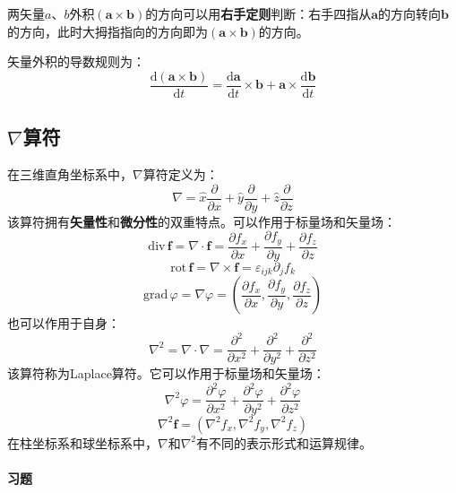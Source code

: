\documentclass[fontset=none,openany,a4paper]{ctexbook}
\begin{document}
两矢量$a$、$b$外积$(\bm{a}\times\bm{b})$的方向可以用\textbf{右手定则}判断：右手四指从$\bm{a}$的方向转向$\bm{b}$的方向，此时大拇指指向的方向即为$(\bm{a}\times\bm{b})$的方向。

矢量外积的导数规则为：
\[
\frac{\mathrm{d}(\bm{a}\times\bm{b})}{\mathrm{d}t} = \frac{\mathrm{d}\bm{a}}{\mathrm{d}t} \times \bm{b} + \bm{a} \times \frac{\mathrm{d}\bm{b}}{\mathrm{d}t}
\]

\subsection{$\nabla$算符}

在三维直角坐标系中，$\nabla$算符定义为：
\[
\nabla = \hat{x}\frac{\partial}{\partial x} + \hat{y}\frac{\partial}{\partial y} + \hat{z}\frac{\partial}{\partial z}
\]
该算符拥有\textbf{矢量性}和\textbf{微分性}的双重特点。可以作用于标量场和矢量场：
\[
\mathrm{div}\,\bm{f} = \nabla \cdot \bm{f} = \frac{\partial f_x}{\partial x} + \frac{\partial f_y}{\partial y} + \frac{\partial f_z}{\partial z}
\]
\[
\mathrm{rot}\,\bm{f} = \nabla \times \bm{f} = \varepsilon_{ijk}\partial_j f_k
\]
\[
\mathrm{grad}\,\varphi = \nabla\varphi = \left(\frac{\partial f_x}{\partial x}, \frac{\partial f_y}{\partial y}, \frac{\partial f_z}{\partial z}\right)
\]
也可以作用于自身：
\[
\nabla^2 = \nabla \cdot \nabla = \frac{\partial^2}{\partial x^2} + \frac{\partial^2}{\partial y^2} + \frac{\partial^2}{\partial z^2}
\]
该算符称为Laplace算符。它可以作用于标量场和矢量场：
\[
\nabla^2 \varphi = \frac{\partial^2 \varphi}{\partial x^2} + \frac{\partial^2 \varphi}{\partial y^2} + \frac{\partial^2 \varphi}{\partial z^2}
\]
\[
\nabla^2\bm{f} = (\nabla^2 f_x, \nabla^2 f_y,\nabla^2 f_z)
\]
在柱坐标系和球坐标系中，$\nabla$和$\nabla^2$有不同的表示形式和运算规律。

\paragraph{习题}
\end{document}

